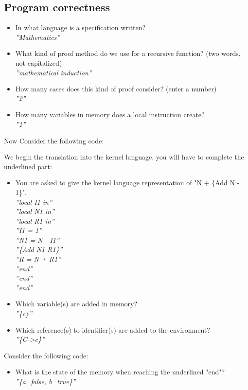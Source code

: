 \documentclass[fr,license=none]{../../../eplsummary}
\begin{document}
		\subsection{Program correctness}
			\begin{itemize}
				\item In what language is a specification written?\\
					\textit{''Mathematics''}
				\item What kind of proof method do we use for a recursive function? (two words, not capitalized)\\
					\textit{''mathematical induction''}
				\item How many cases does this kind of proof consider? (enter a number)\\
					\textit{''2''}
				\item How many variables in memory does a local instruction create?\\
					\textit{''1''}
			\end{itemize}
			Now Consider the following code:
			
			We begin the translation into the kernel language, you will have to complete the underlined part:
			\begin{itemize}
				\item You are asked to give the kernel language representation of "N + \{Add N - 1\}".\\
					\textit{''local I1 in''}\\
					\textit{''local N1 in''}\\
					\textit{''local R1 in''}\\
					\textit{''I1 = 1''}\\
					\textit{''N1 = N - I1''}\\
					\textit{''\{Add N1 R1\}''}\\
					\textit{''R = N + R1''}\\
					\textit{''end''}\\
					\textit{''end''}\\
					\textit{''end''}
				\item Which variable(s) are added in memory?\\
					\textit{''\{c\}''}
				\item Which reference(s) to identifier(s) are added to the environment?\\
					\textit{''\{C->c\}''}
			\end{itemize}
			Consider the following code:
			
			\begin{itemize}
				\item What is the state of the memory when reaching the underlined "end"?\\
					\textit{''\{a=false, b=true\}''}
			\end{itemize}
\end{document}
